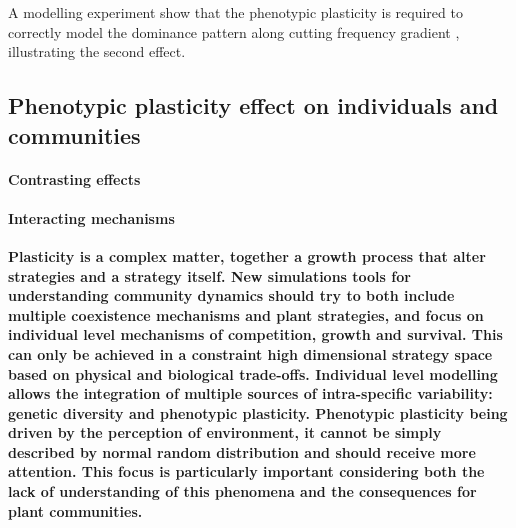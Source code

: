 A modelling experiment show that the phenotypic plasticity is required to correctly model the dominance pattern along cutting frequency gradient \parencite{maire_plasticity_2013}, illustrating the second effect. 




\subsection{Phenotypic plasticity effect on individuals and communities}

\paragraph{Contrasting effects}

\paragraph{Interacting mechanisms}



\textbf{Plasticity is a complex matter, together a growth process that alter strategies and a strategy itself. New simulations tools for understanding community dynamics should try to both include multiple coexistence mechanisms and plant strategies, and focus on individual level mechanisms of competition, growth and survival. This can only be achieved in a constraint high dimensional strategy space based on physical and biological trade-offs. Individual level modelling allows the integration of multiple sources of intra-specific variability: genetic diversity and phenotypic plasticity. Phenotypic plasticity being driven by the perception of environment, it cannot be simply described by normal random distribution and should receive more attention. This focus is particularly important considering both the lack of understanding of this phenomena and the consequences for plant communities.  }



